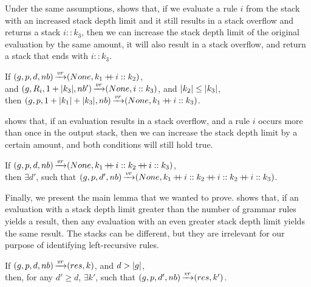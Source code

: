 Under the same assumptions,
 shows that,
if we evaluate a rule $i$ from the stack
with an increased stack depth limit
and it still results in a stack overflow
and returns a stack $i :: k_3$,
then we can increase the stack depth limit
of the original evaluation by the same amount,
it will also result in a stack overflow,
and return a stack that ends with $i :: k_3$.

\begin{lemma}%
    If $(g,p,d,nb) \operatorname{\xrightarrow{\mathit{vr}}} (None,k_1 \operatorname{+\kern -0.4em+} i :: k_2)$, \\
    and $(g,R_{i},1+|k_3|,nb') \operatorname{\xrightarrow{\mathit{vr}}} (None,i :: k_3)$,
    and $|k_2| \le |k_3|$, \\
    then $(g,p,1 + |k_1| + |k_3|,nb) \operatorname{\xrightarrow{\mathit{vr}}} (None,k_1 \operatorname{+\kern -0.4em+} i :: k_3)$.
    \label{lemma:d-increase-lr}
\end{lemma}

 shows that,
if an evaluation results in a stack overflow,
and a rule $i$ occurs more than once in the output stack,
then we can increase the stack depth limit by a certain amount,
and both conditions will still hold true.

\begin{lemma}%
    If $(g,p,d,nb) \operatorname{\xrightarrow{\mathit{vr}}} (None,k_1 \operatorname{+\kern -0.4em+} i :: k_2 \operatorname{+\kern -0.4em+} i :: k_3)$, \\
    then $\exists d'$,
    such that $(g,p,d',nb) \operatorname{\xrightarrow{\mathit{vr}}} (None,k_1 \operatorname{+\kern -0.4em+} i :: k_2 \operatorname{+\kern -0.4em+} i :: k_2 \operatorname{+\kern -0.4em+} i :: k_3)$.
    \label{lemma:repeated-rule-in-stack}
\end{lemma}

Finally, we present the main lemma
that we wanted to prove.
shows that,
if an evaluation with a stack depth limit
greater than the number of grammar rules
yields a result,
then any evaluation with an even greater stack depth limit
yields the same result.
The stacks can be different,
but they are irrelevant
for our purpose of identifying
left-recursive rules.

\begin{lemma}%
    If $(g,p,d,nb) \operatorname{\xrightarrow{\mathit{vr}}} (res,k)$, and $d > |g|$, \\
    then, for any $d' \ge d$,
    $\exists k'$,
    such that $(g,p,d',nb) \operatorname{\xrightarrow{\mathit{vr}}} (res,k')$.
    \label{lemma:stack-depth-convergence}
\end{lemma}

